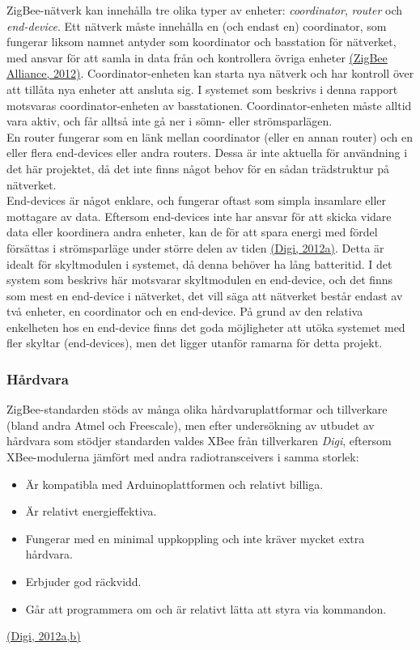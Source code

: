 \documentclass[a4paper,11pt]{article}
\begin{document}
ZigBee-nätverk kan innehålla tre olika typer av enheter: {\it coordinator}, {\it router} och {\it end-device}. Ett nätverk måste innehålla en (och endast en) coordinator, som fungerar liksom namnet antyder som koordinator och basstation för nätverket, med ansvar för att samla in data från och kontrollera övriga enheter \hyperref[zigbee]{(ZigBee Alliance, 2012)}. Coordinator-enheten kan starta nya nätverk och har kontroll över att tillåta nya enheter att ansluta sig. I systemet som beskrivs i denna rapport motsvaras coordinator-enheten av basstationen. Coordinator-enheten måste alltid vara aktiv, och får alltså inte gå ner i sömn- eller strömsparlägen. \\

En router fungerar som en länk mellan coordinator (eller en annan router) och en eller flera end-devices eller andra routers. Dessa är inte aktuella för användning i det här projektet, då det inte finns något behov för en sådan trädstruktur på nätverket. \\

End-devices är något enklare, och fungerar oftast som simpla insamlare eller mottagare av data. Eftersom end-devices inte har ansvar för att skicka vidare data eller koordinera andra enheter, kan de för att spara energi med fördel försättas i strömsparläge under större delen av tiden \hyperref[digi]{(Digi, 2012a)}. Detta är idealt för skyltmodulen i systemet, då denna behöver ha lång batteritid. I det system som beskrivs här motsvarar skyltmodulen en end-device, och det finns som mest en end-device i nätverket, det vill säga att nätverket består endast av två enheter, en coordinator och en end-device. På grund av den relativa enkelheten hos en end-device finns det goda möjligheter att utöka systemet med fler skyltar (end-devices), men det ligger utanför ramarna för detta projekt.

\subsubsection{Hårdvara}
ZigBee-standarden stöds av många olika hårdvaruplattformar och tillverkare (bland andra Atmel och Freescale), men efter undersökning av utbudet av hårdvara som stödjer standarden valdes XBee från tillverkaren {\it Digi}, eftersom XBee-modulerna jämfört med andra radiotransceivers i samma storlek:
	
	\begin{itemize}
	\item Är kompatibla med Arduinoplattformen och relativt billiga.
    	\item Är relativt energieffektiva.
    	\item Fungerar med en minimal uppkoppling och inte kräver mycket extra hårdvara.
    	\item Erbjuder god räckvidd.
    	\item Går att programmera om och är relativt lätta att styra via kommandon.
	\end{itemize}
\hyperref[digi]{(Digi, 2012a,b)}\\
	
\end{document}
